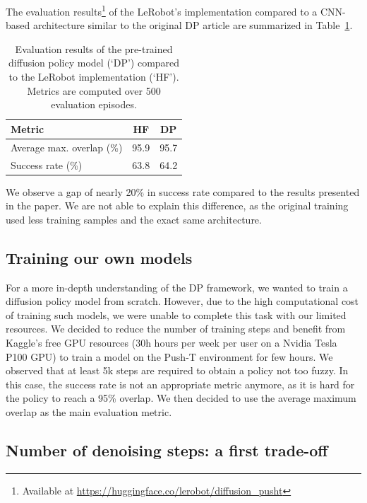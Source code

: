 The evaluation results\footnote{Available at \url{https://huggingface.co/lerobot/diffusion_pusht}} of
the LeRobot's implementation compared to a CNN-based architecture similar to the original DP article are
summarized in Table~\ref{tab:evaluation_results}.
\begin{table}[!htb]
    \centering
    \begin{tabular}{lcc}
    \hline
    Metric & HF & DP \\
    \hline
    Average max. overlap (\%) & 95.9 & 95.7 \\
    Success rate (\%) & 63.8 & 64.2 \\
    \hline
    \end{tabular}
    \caption{Evaluation results of the pre-trained diffusion policy model (`DP') compared to the LeRobot implementation (`HF'). Metrics are computed over 500 evaluation episodes.}
    \label{tab:evaluation_results}
\end{table}
We observe a gap of nearly 20\% in success rate compared to the results presented in the paper.
We are not able to explain this difference, as the original training used less training samples and
the exact same architecture.

\subsection{Training our own models}\label{sec:training_model}

For a more in-depth understanding of the DP framework, we wanted to train a diffusion policy model from scratch.
However, due to the high computational cost of training such models, we were unable to complete this task
with our limited resources. We decided to reduce the number of training steps and benefit from Kaggle's
free GPU resources (30h hours per week per user on a Nvidia Tesla P100 GPU) to train a model
on the Push-T environment for few hours. We observed that at least 5k
steps are required to obtain a policy not too fuzzy. In this case, the success rate is not an appropriate
metric anymore, as it is hard for the policy to reach a 95\% overlap. We then decided to use the average
maximum overlap as the main evaluation metric.

\subsection{Number of denoising steps: a first trade-off}\label{sec:tradeoff_denoising_steps}

